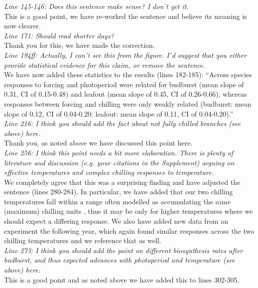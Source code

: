\documentclass[11pt,a4paper]{article}
\begin{document}
\emph{Line 145-146: Does this sentence make sense? I don ́t get it.}\\

This is a good point, we have re-worked the sentence and believe its meaning is now clearer. \\

\emph{Line 171: Should read shorter days?}\\

Thank you for this, we have made the correction. \\

\emph{Line 194ff: Actually, I can ́t see this from the figure. I ́d suggest that you either provide
statistical evidence for this claim, or remove the sentence.}\\

We have now added these statistics to the results (lines 182-185): ``Across species responses to forcing and photoperiod were related for budburst (mean slope of 0.31, CI of 0.15-0.48) and leafout (mean slope of 0.45, CI of 0.26-0.66), whereas responses between forcing and chilling were only weakly related (budburst: mean slope of 0.12, CI of 0.04-0.20; leafout: mean slope of 0.11, CI of 0.04-0.20).''\\

\emph{Line 216: I think you should add the fact about not fully chilled branches (see above) here.}\\

Thank you, as noted above we have discussed this point here. \\

\emph{Line 256: I think this point needs a bit more elaboration. There is plenty of literature and
discussion (e.g. your citations in the Supplement) arguing on effective temperatures and
complex chilling responses to temperature.}\\

We completely agree that this was a surprising finding and have adjusted the sentence (lines 280-284). In particular, we have added that our two chilling temperatures fall within a range often modelled as accumulating the same (maximum) chilling units \citep[for example, see][]{harrington2015}, thus it may be only for higher temperatures where we should expect a differing response. We also have added new data from an experiment the following year, which again found similar responses across the two chilling temperatures and we reference that as well. \\

\emph{Line 273: I think you should add the point on different biosynthesis rates after budburst,
and thus expected advances with photoperiod and temperature (see above) here.}\\

This is a good point and as noted above we have added this to lines 302-305. \\

\newpage

\end{document}
